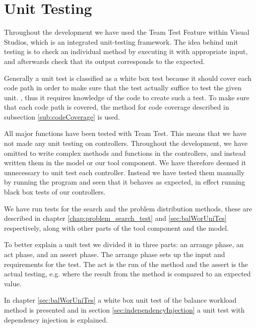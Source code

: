 \section{Unit Testing}
\label{chap:testing}
Throughout the development we have used the Team Test Feature within Visual Studios, which is an integrated unit-testing framework. \cite{teamtest}
The idea behind unit testing is to check an individual method by executing it with appropriate input, and afterwards check that its output corresponds to the expected.

Generally a unit test is classified as a white box test because it should cover each code path in order to make sure that the test actually suffice to test the given unit. \cite[p.~39]{williams06}, thus it requires knowledge of the code to create such a test.
To make sure that each code path is covered, the method for code coverage described in subsection \ref{sub:codeCoverage} is used.

All major functions have been tested with Team Test. This means that we have not made any unit testing on controllers. 
Throughout the development, we have omitted to write complex methods and functions in the controllers, and instead written them in the model or our tool component. We have therefore deemed it unnecessary to unit test each controller. Instead we have tested them manually by running the program and seen that it behaves as expected, in effect running black box tests of our controllers.

We have run tests for the search and the problem distribution methods, these are described in chapter \ref{chap:problem_search_test} and \ref{sec:balWorUniTes} respectively, along with other parts of the tool component and the model.

To better explain a unit test we divided it in three parts: an arrange phase, an act phase, and an assert phase. 
The arrange phase sets up the input and requirements for the test. 
The act is the run of the method and the assert is the actual testing, e.g. where the result from the method is compared to an expected value. 

In chapter \ref{sec:balWorUniTes} a white box unit test of the balance workload method is presented and in section \ref{sec:independencyInjection} a unit test with dependency injection is explained.